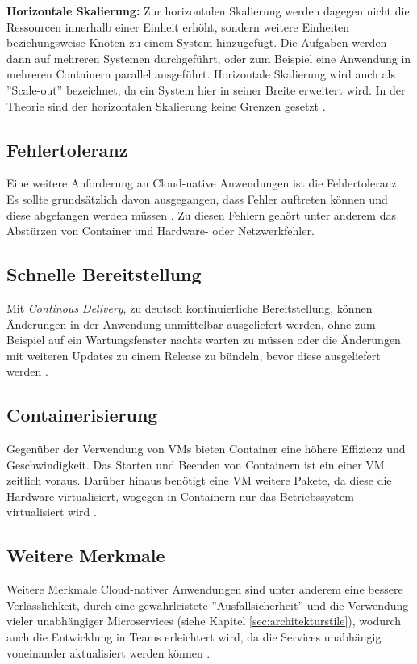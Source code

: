 \textbf{Horizontale Skalierung:}
Zur horizontalen Skalierung werden dagegen nicht die Ressourcen innerhalb einer Einheit erhöht, sondern weitere Einheiten beziehungsweise Knoten zu einem System hinzugefügt. Die Aufgaben werden dann auf mehreren Systemen durchgeführt, oder zum Beispiel eine Anwendung in mehreren Containern parallel ausgeführt. Horizontale Skalierung wird auch als ''Scale-out'' bezeichnet, da ein System hier in seiner Breite erweitert wird. In der Theorie sind der horizontalen Skalierung keine Grenzen gesetzt \cite[Vgl.][]{Geißler2019}\cite[Vgl.][]{VMware}.

\subsection{Fehlertoleranz}
Eine weitere Anforderung an Cloud-native Anwendungen ist die Fehlertoleranz. Es sollte grundsätzlich davon ausgegangen, dass Fehler auftreten können und diese abgefangen werden müssen \cite[Vgl.][S. 17]{Gannon2017}. Zu diesen Fehlern gehört unter anderem das Abstürzen von Container und Hardware- oder Netzwerkfehler.

\subsection{Schnelle Bereitstellung}
Mit \textit{Continous Delivery}, zu deutsch kontinuierliche Bereitstellung, können Änderungen in der Anwendung unmittelbar ausgeliefert werden, ohne zum Beispiel auf ein Wartungsfenster nachts warten zu müssen oder die Änderungen mit weiteren Updates zu einem Release zu bündeln, bevor diese ausgeliefert werden \cite[Vgl.][]{VMwareb}.

\subsection{Containerisierung}
Gegenüber der Verwendung von \acp{VM} bieten Container eine höhere Effizienz und Geschwindigkeit. Das Starten und Beenden von Containern ist ein einer \ac{VM} zeitlich voraus. Darüber hinaus benötigt eine \ac{VM} weitere Pakete, da diese die Hardware virtualisiert, wogegen in Containern nur das Betriebssystem virtualisiert wird \cite[Vgl.][]{VMwareb}.

\subsection{Weitere Merkmale}
Weitere Merkmale Cloud-nativer Anwendungen sind unter anderem eine bessere Verlässlichkeit, durch eine gewährleistete ''Ausfallsicherheit'' und die Verwendung vieler unabhängiger Microservices (siehe Kapitel \ref{sec:architekturstile}), wodurch auch die Entwicklung in Teams erleichtert wird, da die Services unabhängig voneinander aktualisiert werden können \cite[Vgl.][]{VMwareb}.

\pagebreak